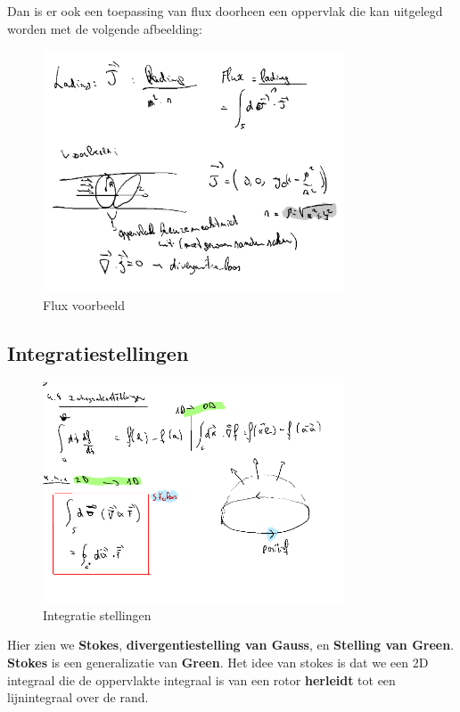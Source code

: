 \documentclass[a4paper]{article}
\begin{document}
Dan is er ook een toepassing van flux doorheen een oppervlak die kan uitgelegd worden met de volgende afbeelding:


\begin{figure}[H]
	\centering
	\includegraphics[width=0.8\textwidth]{assets/flux_voorbeeld.png}
	\caption{Flux voorbeeld}
	\label{fig:flux_voorbeeld}
\end{figure}

\subsection{Integratiestellingen}

\begin{figure}[H]
	\centering
	\includegraphics[width=0.8\textwidth]{assets/IntegratieStellingen.png}
	\caption{Integratie stellingen}
	\label{fig:integratiestellingen}
\end{figure}


Hier zien we \textbf{Stokes}, \textbf{divergentiestelling van Gauss}, en \textbf{Stelling van Green}. \textbf{Stokes} is een generalizatie van \textbf{Green}. Het idee van stokes is dat we een 2D integraal die de oppervlakte integraal is van een rotor \textbf{herleidt} tot een lijnintegraal over de rand.
\end{document}
